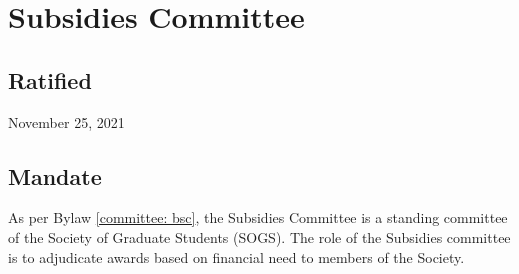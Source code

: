 \section{Subsidies Committee}

\subsection{Ratified}
November 25, 2021

\subsection{Mandate}
As per Bylaw \ref{committee: bsc}, the Subsidies Committee is a standing committee of the Society of Graduate Students (SOGS). The role of the Subsidies committee is to adjudicate awards based on financial need to members of the Society.

